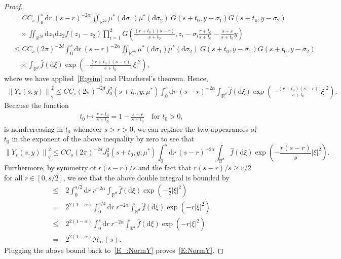 \documentclass[a4paper,11pt]{article}%
\theoremstyle{plain}
\theoremstyle{definition}
\numberwithin{equation}{section}
\newcommand{\R}{\mathbb{R}}
\newcommand{\Norm}[1]{\left\| #1 \right\|}
\newcommand{\ud}{\ensuremath{\mathrm{d}}}
\begin{document}
\begin{proof}
\begin{align*}
    & = C C_s\int_0^s \ud r \: (s-r)^{-2\alpha} \iint_{\R^{2d}} \mu^* (\ud \sigma_1) \mu^* (\ud \sigma_2)\: G(s + t_0,y-\sigma_1)G(s + t_0,y-\sigma_2)                         \\
    & \quad \times\iint_{\R^{2d}} \ud z_1\ud z_2 f(z_1-z_2) \prod_{i = 1}^2 G\left(\frac{(r+t_0)(s-r)}{s + t_0}, z_i-\sigma_i\frac{r + t_0}{s + t_0}-\frac{s-r}{s+t_0}y\right) \\
    & \le C C_s(2\pi)^{-2d} \int_0^s \ud r \: (s-r)^{-2\alpha} \iint_{\R^{2d}}\mu^* (\ud \sigma_1) \mu^* (\ud \sigma_2)\: G(s + t_0,y-\sigma_1)G(s + t_0, y-\sigma_2)          \\
    & \quad \times \int_{\R^d} \widehat{f}(\ud \xi) \exp\left(-\frac{(r + t_0)(s-r)}{s+ t_0}|\xi|^2\right),
  \end{align*}
  where we have applied~\eqref{E:gsim} and Plancherel's theorem. Hence,
  \begin{align*}
   \Norm{Y_v(s,y)}_q^2 \le C C_s (2\pi)^{-2d} J_0^2\left(s + t_0,y;\mu^*\right) \int_0^s \ud r \: (s-r)^{-2\alpha} \int_{\R^d} \widehat{f}(\ud \xi)\exp\left(-\frac{(r + t_0)(s-r)}{s + t_0}|\xi|^2\right).
  \end{align*}
  Because the function
  \begin{align*}
    t_0 \mapsto \frac{r + t_0}{s + t_0} = 1- \frac{s-r}{s+t_0} \quad \text{for $t_0 > 0$},
  \end{align*}
  is nondecreasing in $t_0 $ whenever $s > r > 0$, we can replace the two appearances of $t_0$ in
  the exponent of the above inequality by zero to see that
  \begin{equation}\label{E_:NormY}
    \Norm{Y_v(s,y)}_q^2 \le C C_s (2\pi)^{-2d} J_0^2 (s + t_0,y;\mu^*) \int_0^s \ud r \: (s-r)^{-2\alpha} \int_{\R^d} \widehat{f}(\ud \xi)\exp\left(-\frac{r(s-r)}{s}|\xi|^2\right).
  \end{equation}
  Furthermore, by symmetry of $r(s-r)/s$ and the fact that $r(s-r)/s \ge r/2$ for all $r\in
  [0,s/2]$, we see that the above double integral is bounded by
  \begin{align*}
    \le & \: 2\int_0^{s/2} \ud r \: r^{-2\alpha}\int_{\R^d} \widehat{f}(\ud \xi)\exp\left(-\frac{r}{2}|\xi|^2\right)      \\
    =   & \: 2^{2(1-\alpha)} \int_0^{s/4} \ud r \: r^{-2\alpha}\int_{\R^d} \widehat{f}(\ud \xi)\exp\left(-r|\xi|^2\right) \\
    \le & \: 2^{2(1-\alpha)} \int_0^{s} \ud r \: r^{-2\alpha}\int_{\R^d} \widehat{f}(\ud \xi)\exp\left(-r|\xi|^2\right)   \\
    =   & \: 2^{2(1-\alpha)} \mathcal{H}_\alpha(s).
  \end{align*}
  Plugging the above bound back to~\eqref{E_:NormY} proves~\eqref{E:NormY}. \bigskip


\end{proof}
\end{document}
